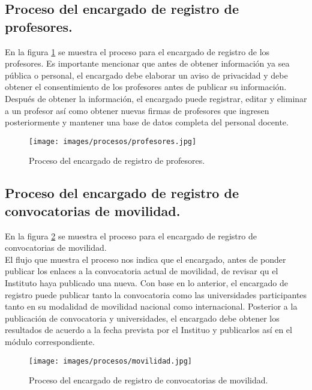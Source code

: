 \subsection{Proceso del encargado de registro de profesores.}

En la figura \ref{fig:profesores} se muestra el proceso para el encargado de registro de los profesores. Es importante mencionar que antes de obtener información ya sea pública o personal, el encargado debe elaborar un aviso de privacidad y debe obtener el consentimiento de los profesores antes de publicar su información. \\

Después de obtener la información, el encargado puede registrar, editar y eliminar a un profesor así como obtener nuevas firmas de profesores que ingresen posteriormente y mantener una base de datos completa del personal docente.

\begin{figure}[h!]
	\begin{center}
		\texttt{[image: images/procesos/profesores.jpg]}
		\caption{Proceso del encargado de registro de profesores.}
		\label{fig:profesores}
	\end{center}
\end{figure}

\subsection{Proceso del encargado de registro de convocatorias de movilidad.}

En la figura \ref{fig:movilidad} se muestra el proceso para el encargado de registro de convocatorias de movilidad. \\

El flujo que muestra el proceso nos indica que el encargado, antes de ponder publicar los enlaces a la convocatoria actual de movilidad, de revisar qu el Instituto haya publicado una nueva. Con base en lo anterior, el encargado de registro puede publicar tanto la convocatoria como las universidades participantes tanto en su modalidad de movilidad nacional como internacional. Posterior a la publicación de convocatoria y universidades, el encargado debe obtener los resultados de acuerdo a la fecha prevista por el Instituo y publicarlos así en el módulo correspondiente.

\begin{figure}[h!]
	\begin{center}
		\texttt{[image: images/procesos/movilidad.jpg]}
		\caption{Proceso del encargado de registro de convocatorias de movilidad.}
		\label{fig:movilidad}
	\end{center}
\end{figure}

